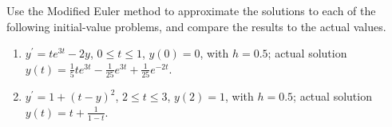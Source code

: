 \begin{myexercise}%
Use the Modified Euler method to approximate the solutions to each of the following initial-value problems, and compare the results to the actual values.
\begin{enumerate}[label=(\alph*)]
\item  $y^{\prime}=t e^{3 t}-2 y$, $0 \leq t \leq 1$, $y(0)=0$, with $h=0.5$; actual solution $y(t)=\frac{1}{5} t e^{3 t}-\frac{1}{25} e^{3 t}+\frac{1}{25} e^{-2 t}$.\\
\item $y^{\prime}=1+(t-y)^{2}$, $2 \leq t \leq 3$, $y(2)=1$, with $h=0.5$; actual solution $y(t)=t+\frac{1}{1-t}$.
 \end{enumerate}


\end{myexercise}
